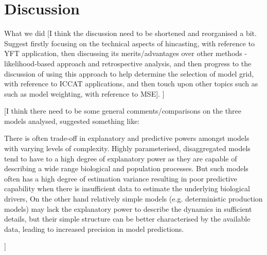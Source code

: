 \section{Discussion}

What we did
[I think the discussion need to be shortened and reorganised a bit. Suggest firstly focusing on the technical aspects of  hincasting, with reference to YFT application, then discussing its merits/advantages over other methods - likelihood-based approach and retrospective analysis, and then progress to the discussion of using this approach to help determine the selection of model grid, with reference to ICCAT applications, and then touch upon other topics such as such as model weighting, with reference to MSE].
]

[I think there need to be some general comments/comparisons on the three models analysed, suggested something like:

There is often trade-off in explanatory and predictive powers amongst models with varying levels of complexity. Highly parameterised, disaggregated models tend to have to a high degree of explanatory power as they are capable of describing a wide range biological and population processes. But such models often has a high degree of estimation variance resulting in poor predictive capability when there is insufficient data to estimate the underlying biological drivers, 
On the other hand relatively simple models (e.g. deterministic production models) may lack the explanatory power to describe the dynamics in sufficient details, but their simple structure can be better characterised by the available data, leading to increased precision in model predictions.

]

